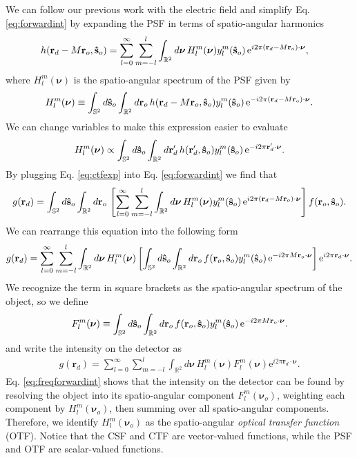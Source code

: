 \documentclass[11pt]{article}
\newcommand{\me}{\mathrm{e}}
\providecommand{\mb}[1]{\mathbf{#1}}
\providecommand{\ro}[1]{\mathbf{\mathbf{r}}_o}
\providecommand{\so}[1]{\mathbf{\hat{s}}_o}
\providecommand{\rd}[1]{\mathbf{r}_d}
\providecommand{\bs}[1]{\boldsymbol{#1}}
\begin{document}
We can follow our previous work with the electric field and simplify Eq.
\ref{eq:forwardint} by expanding the PSF in terms of spatio-angular harmonics
\begin{align}
  h(\rd{} - M\mb{r}_o, \so{}) &= \sum_{l=0}^{\infty} \sum_{m=-l}^l \int_{\mathbb{R}^2}d\bs{\nu}{}\, H_l^m(\bs{\nu})y_l^m(\so{})\thinspace\me^{i 2\pi (\rd{} - M\ro{})\cdot\bs{\nu}},\label{eq:ctfexp}
\end{align}
where $H_l^m(\bs{\nu})$ is the spatio-angular spectrum of the PSF given
by
\begin{align}
  H_l^m(\bs{\nu}) \equiv \int_{\mathbb{S}^2}d\so{}\int_{\mathbb{R}^2}d\ro{}\, h(\rd{} - M\ro{}, \so{}) y_l^m(\so{})\thinspace\me^{-i 2\pi (\rd{} - M\ro{})\cdot\bs{\nu}}.\label{eq:ctfdef}
\end{align}
We can change variables to make this expression easier to evaluate
\begin{align}
  H_l^m(\bs{\nu}) \propto \int_{\mathbb{S}^2}d\so{}\int_{\mathbb{R}^2}d\rd{}'\, h(\rd{}', \so{}) y_l^m(\so{})\thinspace\me^{-i 2\pi \rd{}'\cdot\bs{\nu}}.\label{eq:otfdef2}
\end{align}
By plugging Eq. \ref{eq:ctfexp} into Eq. \ref{eq:forwardint} we find that
\begin{align}
  g(\rd{}) = \int_{\mathbb{S}^2}d\so{}\int_{\mathbb{R}^2}d\ro{}\, \left[\sum_{l=0}^{\infty} \sum_{m=-l}^l \int_{\mathbb{R}^2}d\bs{\nu}{}\, H_l^m(\bs{\nu})y_l^m(\so{})\thinspace\me^{i 2\pi (\rd{} - M\ro{})\cdot\bs{\nu}}\right]f(\ro{}, \so{}). \label{eq:freqforwardint}
\end{align}
We can rearrange this equation into the following form
\begin{align}
  g(\rd{}) = \sum_{l=0}^{\infty} \sum_{m=-l}^l \int_{\mathbb{R}^2}d\bs{\nu}{}\, H_l^m(\bs{\nu}) \left[\int_{\mathbb{S}^2}d\so{}\int_{\mathbb{R}^2}d\ro{}\, f(\ro{}, \so{})y_l^m(\so{})\thinspace\me^{-i 2\pi M\ro{}\cdot\bs{\nu}}\right] \me^{i 2\pi \rd{}\cdot\bs{\nu}}. \label{eq:freqforward}
\end{align}
We recognize the term in square brackets as the spatio-angular spectrum of the
object, so we define
\begin{align}
F_l^m(\bs{\nu}) \equiv \int_{\mathbb{S}^2}d\so{}\int_{\mathbb{R}^2}d\ro{} \, f(\mb{r}_o, \so{}) y_l^m(\so{})\thinspace\me^{-i 2\pi M\ro{}\cdot\bs{\nu}}.  \label{eq:saspect}
\end{align}
and write the intensity on the detector as
\begin{align}
  g(\rd{}) = \sum_{l=0}^{\infty} \sum_{m=-l}^l \int_{\mathbb{R}^2}d\bs{\nu}{}\, H_l^m(\bs{\nu}) F_l^m(\mb{\nu}) \me^{i 2\pi \rd{}\cdot\bs{\nu}}. \label{eq:freqforwardint}
\end{align}
Eq. \ref{eq:freqforwardint} shows that the intensity on the detector can be
found by resolving the object into its spatio-angular component
$F_l^m(\mb{\nu}_o)$, weighting each component by $H_l^m(\mb{\nu}_o)$, then
summing over all spatio-angular components. Therefore, we identify
$H_l^m(\mb{\nu}_o)$ as the spatio-angular \textit{optical transfer function}
(OTF). Notice that the CSF and CTF are vector-valued functions, while the PSF
and OTF are scalar-valued functions.
\end{document}
